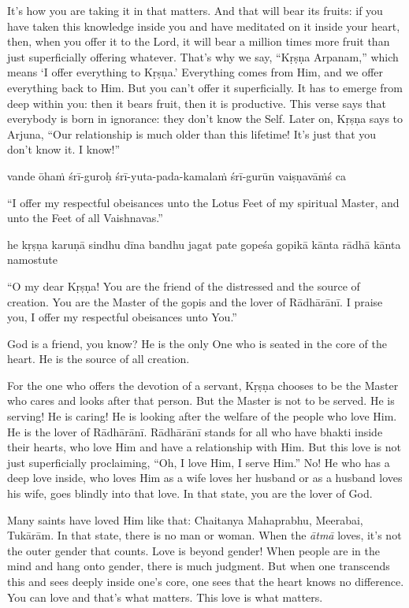 It’s how you are taking it in that matters. And that will bear its fruits: if you have taken this knowledge inside you and have meditated on it inside your heart, then, when you offer it to the Lord, it will bear a million times more fruit than just superficially offering whatever. That’s why we say, “Kṛṣṇa Arpanam,” which means ‘I offer everything to Kṛṣṇa.’ Everything comes from Him, and we offer everything back to Him. But you can’t offer it superficially. It has to emerge from deep within you: then it bears fruit, then it is productive. This verse says that everybody is born in ignorance: they don’t know the Self. Later on, Kṛṣṇa says to Arjuna, “Our relationship is much older than this lifetime! It’s just that you don’t know it. I know!”

vande ōhaṁ śrī-guroḥ śrī-yuta-pada-kamalaṁ śrī-gurūn vaiṣṇavāṁś ca

“I offer my respectful obeisances unto the Lotus Feet of my spiritual Master, and unto the Feet of all Vaishnavas.”

he kṛṣṇa karuṇā sindhu dīna bandhu jagat pate gopeśa gopikā kānta rādhā kānta namostute

“O my dear Kṛṣṇa! You are the friend of the distressed and the source of creation. You are the Master of the gopis and the lover of Rādhārānī. I praise you, I offer my respectful obeisances unto You.”

God is a friend, you know? He is the only One who is seated in the core of the heart. He is the source of all creation.

For the one who offers the devotion of a servant, Kṛṣṇa chooses to be the Master who cares and looks after that person. But the Master is not to be served. He is serving! He is caring! He is looking after the welfare of the people who love Him. He is the lover of Rādhārānī. Rādhārānī stands for all who have bhakti inside their hearts, who love Him and have a relationship with Him. But this love is not just superficially proclaiming, “Oh, I love Him, I serve Him.” No! He who has a deep love inside, who loves Him as a wife loves her husband or as a husband loves his wife, goes blindly into that love. In that state, you are the lover of God.

Many saints have loved Him like that: Chaitanya Mahaprabhu, Meerabai, Tukārām. In that state, there is no man or woman. When the \textit{ātmā} loves, it’s not the outer gender that counts. Love is beyond gender! When people are in the mind and hang onto gender, there is much judgment. But when one transcends this and sees deeply inside one’s core, one sees that the heart knows no difference. You can love and that’s what matters. This love is what matters.

